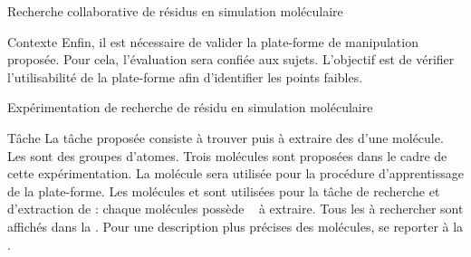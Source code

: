 \documentclass[myfrancais]{mythesis}
\begin{document}
\begin{mychapter}{Recherche collaborative de résidus en simulation moléculaire}
\begin{mysection}{Contexte}
			Enfin, il est nécessaire de valider la plate-forme de manipulation proposée.
			Pour cela, l'évaluation sera confiée aux sujets.
			L'objectif est de vérifier l'utilisabilité de la plate-forme afin d'identifier les points faibles.
		\end{mysection}
		\begin{mysection}{Expérimentation de recherche de résidu en simulation moléculaire}
			\begin{mysubsection}[sse-exp1-Tache]{Tâche}
				La tâche proposée consiste à trouver puis à extraire des  d'une molécule.
				Les  sont des groupes d'atomes.
				Trois molécules sont proposées dans le cadre de cette expérimentation.
				La molécule \myTRPZIPPER sera utilisée pour la procédure d'apprentissage de la plate-forme.
				Les molécules \myTRPCAGE et \myPrion sont utilisées pour la tâche de recherche et d'extraction de  : chaque molécules possède ~ à extraire.
				Tous les  à rechercher sont affichés dans la .
				Pour une description plus précises des molécules, se reporter à la .


\end{mysubsection}
\end{mysection}
\end{mychapter}
\end{document}
